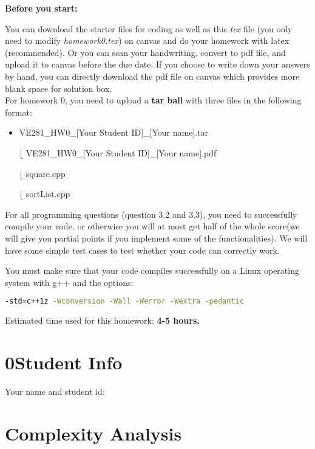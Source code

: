 \documentclass[11pt]{exam}
\begin{document}
\setlength{\parindent}{0pt}
\textbf{Before you start:}

You can download the starter files for coding as well as this \textit{tex} file (you only need to modify \textit{homework0.tex}) on canvas and do your homework with latex (recommended). Or you can scan your handwriting, convert to pdf file, and upload it to canvas before the due date. If you choose to write down your answers by hand, you can directly download the pdf file on canvas which provides more blank space for solution box.\\

For homework 0, you need to upload a \textbf{tar ball} with three files in the following format:
\begin{itemize}
\item VE281\_HW0\_[Your Student ID]\_[Your name].tar

$\lfloor$ VE281\_HW0\_[Your Student ID]\_[Your name].pdf

$\lfloor$ square.cpp

$\lfloor$ sortList.cpp
\end{itemize}

For all programming questions (question 3.2 and 3.3), you need to successfully compile your code, or otherwise you will at most get half of the whole score(we will give you partial points if you implement some of the functionalities). We will have some simple test cases to test whether your code can correctly work.

You must make sure that your code compiles successfully on a Linux operating system with g++ and the options:
\begin{lstlisting}[language=bash]
-std=c++1z -Wconversion -Wall -Werror -Wextra -pedantic
\end{lstlisting}

Estimated time used for this homework: \textbf{4-5 hours.}

\section*{0\quad Student Info}
Your name and student id:
\begin{solution}
\end{solution}

\section{Complexity Analysis}
\end{document}
